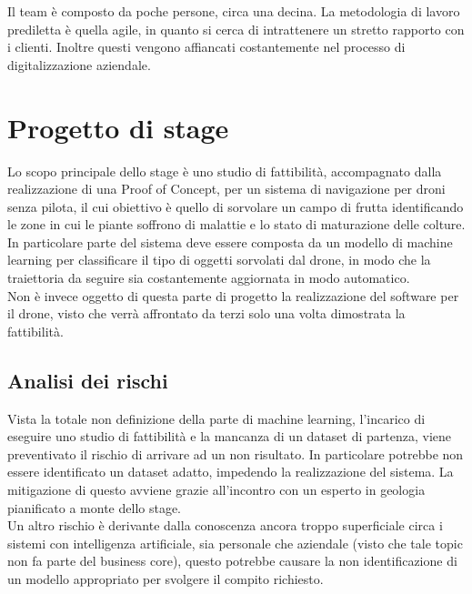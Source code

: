 Il team è composto da poche persone, circa una decina. La metodologia di lavoro prediletta è quella agile, in quanto si cerca di intrattenere un stretto rapporto con i clienti. Inoltre questi vengono affiancati costantemente nel processo di digitalizzazione aziendale.

\section{Progetto di stage}

Lo scopo principale dello stage è uno studio di fattibilità, accompagnato dalla realizzazione di una Proof of Concept, per un sistema di navigazione
per droni senza pilota, il cui obiettivo è quello di sorvolare un campo di frutta identificando le zone in cui le piante soffrono di malattie e lo stato
di maturazione delle colture.\\
In particolare parte del sistema deve essere composta da un modello di machine learning per classificare il tipo di oggetti sorvolati dal drone,
in modo che la traiettoria da seguire sia costantemente aggiornata in modo automatico.\\
Non è invece oggetto di questa parte di progetto la realizzazione del software per il drone, visto che verrà affrontato da terzi solo una volta dimostrata
la fattibilità.

\subsection{Analisi dei rischi}
Vista la totale non definizione della parte di machine learning, l'incarico di eseguire uno studio di fattibilità e la mancanza di un dataset di partenza, viene preventivato il rischio di arrivare ad un non risultato.
In particolare potrebbe non essere identificato un dataset adatto, impedendo la realizzazione del sistema. La mitigazione di questo avviene grazie
all'incontro con un esperto in geologia pianificato a monte dello stage.\\
Un altro rischio è derivante dalla conoscenza ancora troppo superficiale circa i sistemi con intelligenza artificiale, sia personale che aziendale (visto che tale
topic non fa parte del business core), questo potrebbe causare la non identificazione di un modello appropriato per svolgere il compito richiesto.

